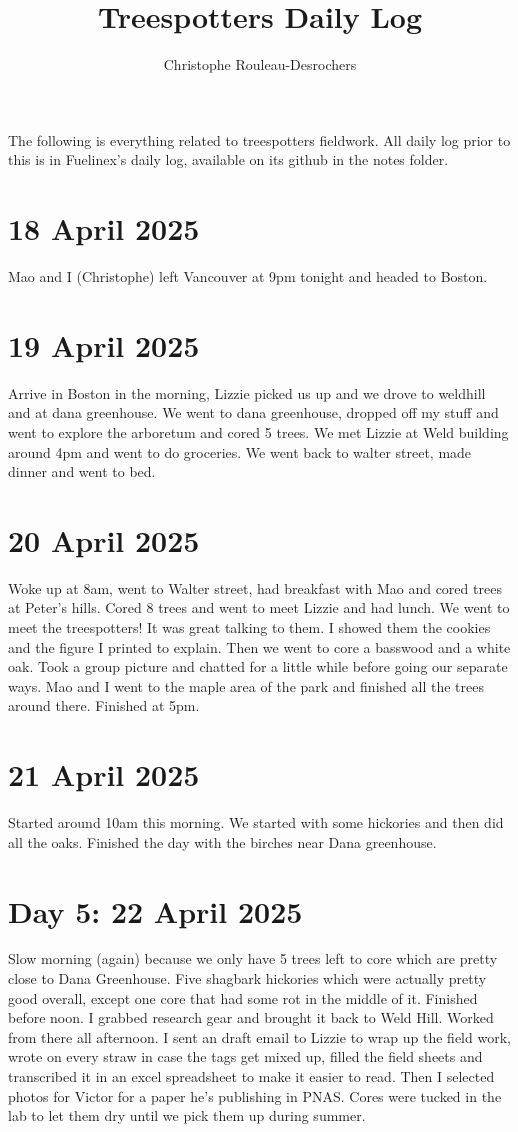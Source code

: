 \documentclass{article}
\begin{document}
\title{Treespotters Daily Log}
\author{Christophe Rouleau-Desrochers}
\maketitle

The following is everything related to treespotters fieldwork. All daily log prior to this is in Fuelinex's daily log, available on its github in the notes folder.

\section*{18 April 2025}
Mao and I (Christophe) left Vancouver at 9pm tonight and headed to Boston. 

\section*{19 April 2025}
Arrive in Boston in the morning, Lizzie picked us up and we drove to weldhill and at dana greenhouse. We went to dana greenhouse, dropped off my stuff and went to explore the arboretum and cored 5 trees. We met Lizzie at Weld building around 4pm and went to do groceries. We went back to walter street, made dinner and went to bed.

\section*{ 20 April 2025}
Woke up at 8am, went to Walter street, had breakfast with Mao and cored trees at Peter's hills. Cored 8 trees and went to meet Lizzie and had lunch. We went to meet the treespotters! It was great talking to them. I showed them the cookies and the figure I printed to explain. Then we went to core a basswood and a white oak. Took a group picture and chatted for a little while before going our separate ways. Mao and I went to the maple area of the park and finished all the trees around there. Finished at 5pm.

\section*{21 April 2025}
Started around 10am this morning. We started with some hickories and then did all the oaks. Finished the day with the birches near Dana greenhouse. 

\section*{Day 5: 22 April 2025}
Slow morning (again) because we only have 5 trees left to core which are pretty close to Dana Greenhouse. Five shagbark hickories which were actually pretty good overall, except one core that had some rot in the middle of it. Finished before noon. I grabbed research gear and brought it back to Weld Hill. Worked from there all afternoon. I sent an draft email to Lizzie to wrap up the field work, wrote on every straw in case the tags get mixed up, filled the field sheets and transcribed it in an excel spreadsheet to make it easier to read. Then I selected photos for Victor for a paper he's publishing in PNAS. Cores were tucked in the lab to let them dry until we pick them up during summer. 
\end{document}
